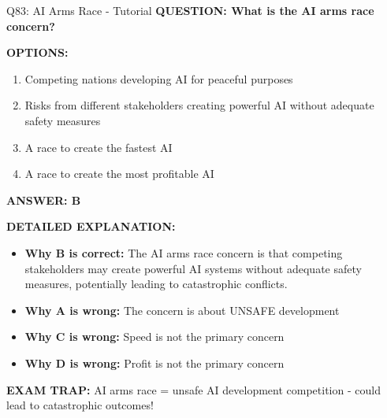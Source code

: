 \documentclass[8pt]{beamer}
\begin{document}
	\begin{frame}{Q83: AI Arms Race - Tutorial}
		\fontsize{6.5}{7.5}\selectfont
		\textbf{QUESTION: What is the AI arms race concern?}
		
		\vspace{0.1cm}
		\textbf{OPTIONS:}
		\begin{enumerate}
			\item Competing nations developing AI for peaceful purposes
			\item Risks from different stakeholders creating powerful AI without adequate safety measures
			\item A race to create the fastest AI
			\item A race to create the most profitable AI
		\end{enumerate}
		
		\vspace{0.1cm}
		\textcolor{myblue}{\textbf{ANSWER: B}}
		
		\vspace{0.1cm}
		\textbf{DETAILED EXPLANATION:}
		\begin{itemize}
			\item \textbf{Why B is correct:} The AI arms race concern is that competing stakeholders may create powerful AI systems without adequate safety measures, potentially leading to catastrophic conflicts.
			\item \textbf{Why A is wrong:} The concern is about UNSAFE development
			\item \textbf{Why C is wrong:} Speed is not the primary concern
			\item \textbf{Why D is wrong:} Profit is not the primary concern
		\end{itemize}
		
		\textcolor{myred}{\textbf{EXAM TRAP:}} AI arms race = \textcolor{myblue}{unsafe AI development competition} - could lead to catastrophic outcomes!
	\end{frame}
	
\end{document}

